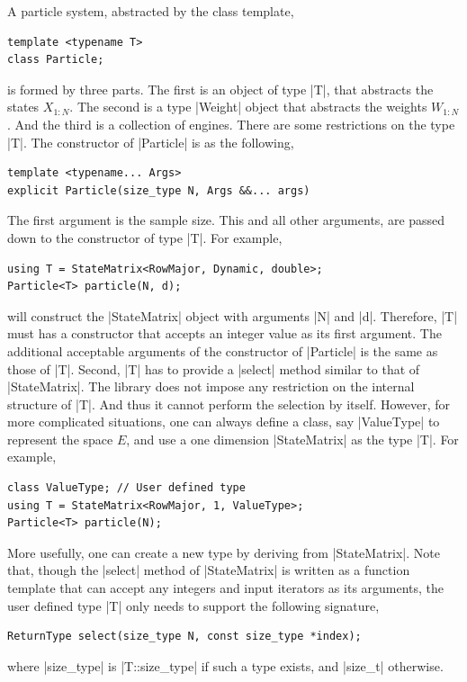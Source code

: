 A particle system, abstracted by the class template,
\begin{Verbatim}
template <typename T>
class Particle;
\end{Verbatim}
is formed by three parts. The first is an object of type |T|, that abstracts
the states $X_{1:N}$. The second is a type |Weight| object that abstracts the
weights $W_{1:N}$. And the third is a collection of \rng engines. There are
some restrictions on the type |T|. The constructor of |Particle| is as the
following,
\begin{Verbatim}
template <typename... Args>
explicit Particle(size_type N, Args &&... args)
\end{Verbatim}
The first argument is the sample size. This and all other arguments, are passed
down to the constructor of type |T|. For example,
\begin{Verbatim}
using T = StateMatrix<RowMajor, Dynamic, double>;
Particle<T> particle(N, d);
\end{Verbatim}
will construct the |StateMatrix| object with arguments |N| and |d|. Therefore,
|T| must has a constructor that accepts an integer value as its first argument.
The additional acceptable arguments of the constructor of |Particle| is the
same as those of |T|. Second, |T| has to provide a |select| method similar to
that of |StateMatrix|. The library does not impose any restriction on the
internal structure of |T|. And thus it cannot perform the selection by itself.
However, for more complicated situations, one can always define a class, say
|ValueType| to represent the space $E$, and use a one dimension |StateMatrix|
as the type |T|. For example,
\begin{Verbatim}
class ValueType; // User defined type
using T = StateMatrix<RowMajor, 1, ValueType>;
Particle<T> particle(N);
\end{Verbatim}
More usefully, one can create a new type by deriving from |StateMatrix|. Note
that, though the |select| method of |StateMatrix| is written as a function
template that can accept any integers and input iterators as its arguments, the
user defined type |T| only needs to support the following signature,
\begin{Verbatim}
ReturnType select(size_type N, const size_type *index);
\end{Verbatim}
where |size_type| is |T::size_type| if such a type exists, and |size_t|
otherwise.

